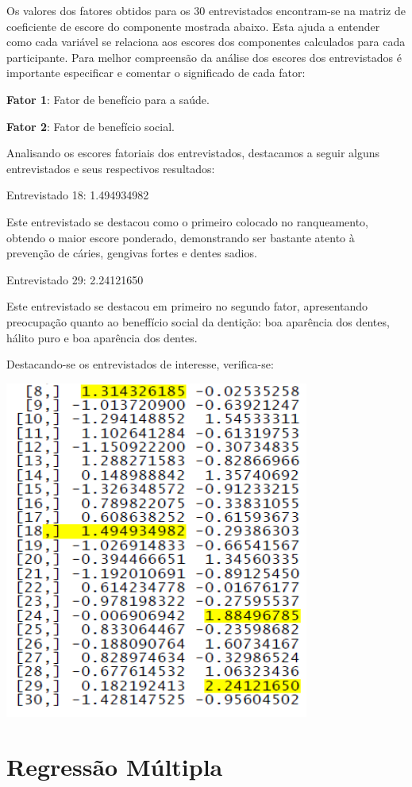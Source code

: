 \documentclass[12pt,brazil,]{book}
\begin{document}
Os valores dos fatores obtidos para os 30 entrevistados encontram-se na
matriz de coeficiente de escore do componente mostrada abaixo. Esta
ajuda a entender como cada variável se relaciona aos escores dos
componentes calculados para cada participante. Para melhor compreensão
da análise dos escores dos entrevistados é importante especificar e
comentar o significado de cada fator:

\textbf{Fator 1}: Fator de benefício para a saúde.

\textbf{Fator 2}: Fator de benefício social.

Analisando os escores fatoriais dos entrevistados, destacamos a seguir
alguns entrevistados e seus respectivos resultados:

Entrevistado 18: 1.494934982

Este entrevistado se destacou como o primeiro colocado no ranqueamento,
obtendo o maior escore ponderado, demonstrando ser bastante atento à
prevenção de cáries, gengivas fortes e dentes sadios.

Entrevistado 29: 2.24121650

Este entrevistado se destacou em primeiro no segundo fator, apresentando
preocupação quanto ao beneffício social da dentição: boa aparência dos
dentes, hálito puro e boa aparência dos dentes.

Destacando-se os entrevistados de interesse, verifica-se:

\includegraphics{anfat2.png}

\hypertarget{regressao-multipla}{%
\chapter{Regressão Múltipla}\label{regressao-multipla}}
\end{document}
